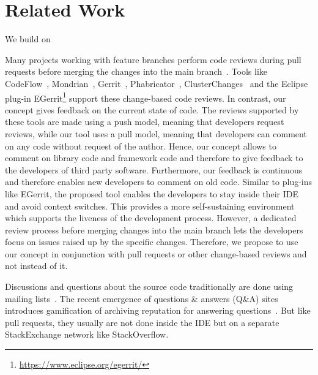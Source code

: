 
\section{Related Work}
We build on \cite{Duerschmid2017CCR}


Many projects working with feature branches perform code reviews during pull requests before merging the changes into the main branch~\cite{driessen2010successful, calefato2015PLE, yu2015pullrequests, tsay2014contributionGithub, gousios2014PullBasedSD, rahman2014pullrequests, tsay2014ContributionDiscussion}. 
%
Tools like CodeFlow~\cite{bird2015CodeReviewPlatform}, Mondrian~\cite{kennedy2006Mondrian}, Gerrit~\cite{google2016gerrit},  Phabricator~\cite{tsotsis2011Phabricator}, ClusterChanges~\cite{barnett2015helpingdevelopers} and the Eclipse plug-in EGerrit\footnote{\url{https://www.eclipse.org/egerrit/}} support these change-based code reviews.
%
In contrast, our concept gives feedback on the current state of code. 
%
The reviews supported by these tools are made using a push model, meaning that developers request reviews, while our tool uses a pull model, meaning that developers can comment on any code without request of the author.
%
Hence, our concept allows to comment on library code and framework code and therefore to give feedback to the developers of third party software. 
%
Furthermore, our feedback is continuous and therefore enables new developers to comment on old code. 
%
Similar to plug-ins like EGerrit, the proposed tool enables the developers to stay inside their IDE and avoid context switches.
%
This provides a more self-sustaining environment which supports the liveness of the development process. 
%
However, a dedicated review process before merging changes into the main branch lets the developers focus on issues raised up by the specific changes. 
%
Therefore, we propose to use our concept in conjunction with pull requests or other change-based reviews and not instead of it.
%

%
Discussions and questions about the source code traditionally are done using mailing lists~\cite{vasilescu2014QA}.
%
The recent emergence of questions \& answers (Q\&A) sites introduces gamification of archiving reputation for answering questions~\cite{vasilescu2014QA}.
%
But like pull requests, they usually are not done inside the IDE but on a separate StackExchange network like StackOverflow.